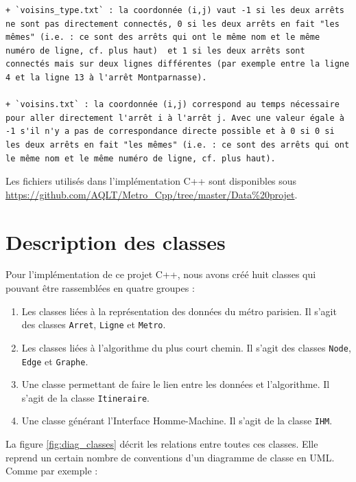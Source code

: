 \documentclass[,french]{article}
\begin{document}
\begin{verbatim}
+ `voisins_type.txt` : la coordonnée (i,j) vaut -1 si les deux arrêts ne sont pas directement connectés, 0 si les deux arrêts en fait "les mêmes" (i.e. : ce sont des arrêts qui ont le même nom et le même numéro de ligne, cf. plus haut)  et 1 si les deux arrêts sont connectés mais sur deux lignes différentes (par exemple entre la ligne 4 et la ligne 13 à l'arrêt Montparnasse).

+ `voisins.txt` : la coordonnée (i,j) correspond au temps nécessaire pour aller directement l'arrêt i à l'arrêt j. Avec une valeur égale à -1 s'il n'y a pas de correspondance directe possible et à 0 si 0 si les deux arrêts en fait "les mêmes" (i.e. : ce sont des arrêts qui ont le même nom et le même numéro de ligne, cf. plus haut).
\end{verbatim}

Les fichiers utilisés dans l'implémentation C++ sont disponibles sous
\url{https://github.com/AQLT/Metro_Cpp/tree/master/Data\%20projet}.

\hypertarget{sec:desc_classes}{%
\section{Description des classes}\label{sec:desc_classes}}

Pour l'implémentation de ce projet C++, nous avons créé huit classes qui
pouvant être rassemblées en quatre groupes :

\begin{enumerate}
\def\labelenumi{\arabic{enumi}.}
\item
  Les classes liées à la représentation des données du métro parisien.
  Il s'agit des classes \texttt{Arret}, \texttt{Ligne} et
  \texttt{Metro}.
\item
  Les classes liées à l'algorithme du plus court chemin. Il s'agit des
  classes \texttt{Node}, \texttt{Edge} et \texttt{Graphe}.
\item
  Une classe permettant de faire le lien entre les données et
  l'algorithme. Il s'agit de la classe \texttt{Itineraire}.
\item
  Une classe générant l'Interface Homme-Machine. Il s'agit de la classe
  \texttt{IHM}.
\end{enumerate}

La figure \ref{fig:diag_classes} décrit les relations entre toutes ces
classes. Elle reprend un certain nombre de conventions d'un diagramme de
classe en UML. Comme par exemple :
\end{document}
